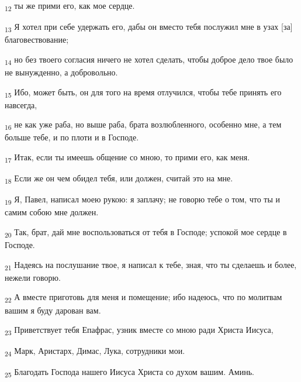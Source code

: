 \begin{tcolorbox}
\textsubscript{12} ты же прими его, как мое сердце.
\end{tcolorbox}
\begin{tcolorbox}
\textsubscript{13} Я хотел при себе удержать его, дабы он вместо тебя послужил мне в узах [за] благовествование;
\end{tcolorbox}
\begin{tcolorbox}
\textsubscript{14} но без твоего согласия ничего не хотел сделать, чтобы доброе дело твое было не вынужденно, а добровольно.
\end{tcolorbox}
\begin{tcolorbox}
\textsubscript{15} Ибо, может быть, он для того на время отлучился, чтобы тебе принять его навсегда,
\end{tcolorbox}
\begin{tcolorbox}
\textsubscript{16} не как уже раба, но выше раба, брата возлюбленного, особенно мне, а тем больше тебе, и по плоти и в Господе.
\end{tcolorbox}
\begin{tcolorbox}
\textsubscript{17} Итак, если ты имеешь общение со мною, то прими его, как меня.
\end{tcolorbox}
\begin{tcolorbox}
\textsubscript{18} Если же он чем обидел тебя, или должен, считай это на мне.
\end{tcolorbox}
\begin{tcolorbox}
\textsubscript{19} Я, Павел, написал моею рукою: я заплачу; не говорю тебе о том, что ты и самим собою мне должен.
\end{tcolorbox}
\begin{tcolorbox}
\textsubscript{20} Так, брат, дай мне воспользоваться от тебя в Господе; успокой мое сердце в Господе.
\end{tcolorbox}
\begin{tcolorbox}
\textsubscript{21} Надеясь на послушание твое, я написал к тебе, зная, что ты сделаешь и более, нежели говорю.
\end{tcolorbox}
\begin{tcolorbox}
\textsubscript{22} А вместе приготовь для меня и помещение; ибо надеюсь, что по молитвам вашим я буду дарован вам.
\end{tcolorbox}
\begin{tcolorbox}
\textsubscript{23} Приветствует тебя Епафрас, узник вместе со мною ради Христа Иисуса,
\end{tcolorbox}
\begin{tcolorbox}
\textsubscript{24} Марк, Аристарх, Димас, Лука, сотрудники мои.
\end{tcolorbox}
\begin{tcolorbox}
\textsubscript{25} Благодать Господа нашего Иисуса Христа со духом вашим. Аминь.
\end{tcolorbox}
